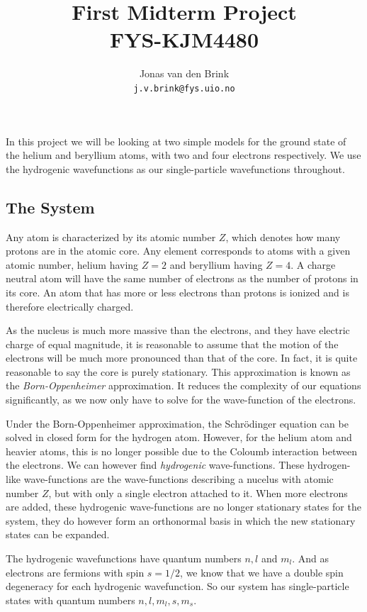 \documentclass[a4paper, 11pt, notitlepage, english]{article}
\author{Jonas van den Brink \\ \texttt{j.v.brink@fys.uio.no}}
\title{First Midterm Project \\ FYS-KJM4480}
\begin{document}
\maketitle

In this project we will be looking at two simple models for the ground state of the helium and beryllium atoms, with two and four electrons respectively. We use the hydrogenic wavefunctions as our single-particle wavefunctions throughout.

\subsection*{The System}
Any atom is characterized by its atomic number $Z$, which denotes how many protons are in the atomic core. Any element corresponds to atoms with a given atomic number, helium having $Z=2$ and beryllium having $Z=4$. A charge neutral atom will have the same number of electrons as the number of protons in its core. An atom that has more or less electrons than protons is ionized and is therefore electrically charged.

As the nucleus is much more massive than the electrons, and they have electric charge of equal magnitude, it is reasonable to assume that the motion of the electrons will be much more pronounced than that of the core. In fact, it is quite reasonable to say the core is purely stationary. This approximation is known as the \emph{Born-Oppenheimer} approximation. It reduces the complexity of our equations significantly, as we now only have to solve for the wave-function of the electrons.

Under the Born-Oppenheimer approximation, the Schrödinger equation can be solved in closed form for the hydrogen atom. However, for the helium atom and heavier atoms, this is no longer possible due to the Coloumb interaction between the electrons. We can however find \emph{hydrogenic} wave-functions. These hydrogen-like wave-functions are the wave-functions describing a nucelus with atomic number $Z$, but with only a single electron attached to it. When more electrons are added, these hydrogenic wave-functions are no longer stationary states for the system, they do however form an orthonormal basis in which the new stationary states can be expanded.

The hydrogenic wavefunctions have quantum numbers $n, l$ and $m_l$. And as electrons are fermions with spin $s=1/2$, we know that we have a double spin degeneracy for each hydrogenic wavefunction. So our system has single-particle states with quantum numbers $n, l, m_l, s, m_s$.
\end{document}
